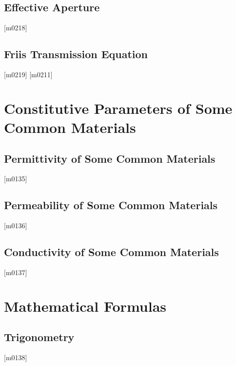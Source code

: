 \documentclass[10pt,letterpaper,twocolumn,openany]{book}
\theoremstyle{definition} %
\begin{document}
    \section{Effective Aperture}
{\color{blue}\tiny[m0218]}      
      \vfill\break
    \section{Friis Transmission Equation}
{\color{blue}\tiny[m0219]}      
{\color{blue}\tiny[m0211]}    
\appendix
  \chapter{Constitutive Parameters of Some Common Materials}
  \thispagestyle{fancy} %
  \fancyhf{}            %
    \section{Permittivity of Some Common Materials}
{\color{blue}\tiny[m0135]}      
      \vfill\break
    \section{Permeability of Some Common Materials}
{\color{blue}\tiny[m0136]}      
      \vfill\break
    \section{Conductivity of Some Common Materials}
{\color{blue}\tiny[m0137]}      
      \vfill\break
  \chapter{Mathematical Formulas}
  \thispagestyle{fancy} %
  \fancyhf{}            %
    \section{Trigonometry}
{\color{blue}\tiny[m0138]}      
      \vfill\break
\end{document}
